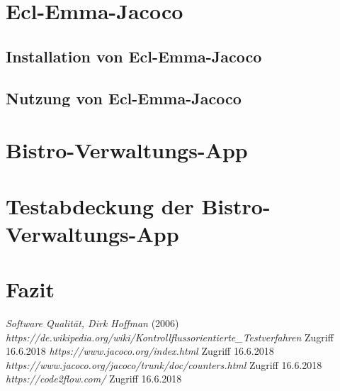 \documentclass[a4paper]{article}
\author{Mario Groneick, Marcel Brockskothen}
\begin{document}

\tableofcontents
\section{Ecl-Emma-Jacoco}
\subsection{Installation von Ecl-Emma-Jacoco}
\subsection{Nutzung von Ecl-Emma-Jacoco}
\section{Bistro-Verwaltungs-App}
\section{Testabdeckung der Bistro-Verwaltungs-App}
\section{Fazit}
\begin{thebibliography}{1}
	 \emph{Software Qualität, Dirk Hoffman} (2006)
	 \emph{https://de.wikipedia.org/wiki/Kontrollflussorientierte\_Testverfahren} Zugriff 16.6.2018
	 \emph{https://www.jacoco.org/index.html} Zugriff 16.6.2018
	 \emph{https://www.jacoco.org/jacoco/trunk/doc/counters.html} Zugriff 16.6.2018
	 \emph{https://code2flow.com/} Zugriff 16.6.2018
\end{thebibliography}
\end{document}

